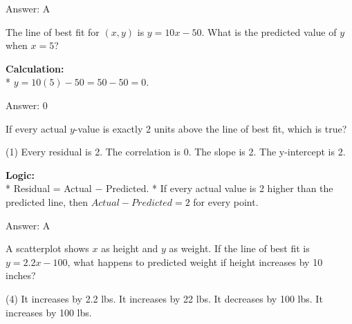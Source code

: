 \documentclass[11pt,paper=a4,answers]{exam}
\begin{document}
\begin{questions}
\begin{solution}
\vspace{30pt}

Answer: \colorbox{yellow!100}{A}
\end{solution}

\vspace{60pt}

\question
The line of best fit for $(x, y)$ is $y = 10x - 50$. What is the predicted value of $y$ when $x = 5$?

\begin{solution}
\textbf{Calculation:} \\
* $y = 10(5) - 50 = 50 - 50 = 0$.

\vspace{30pt}

Answer: \colorbox{yellow!100}{0}
\end{solution}

\vspace{60pt}

\question
If every actual $y$-value is exactly 2 units above the line of best fit, which is true?
\begin{tasks}(1)
    \task Every residual is 2.
    \task The correlation is 0.
    \task The slope is 2.
    \task The y-intercept is 2.
\end{tasks}

\begin{solution}
\textbf{Logic:} \\
* Residual = Actual $-$ Predicted.
* If every actual value is 2 higher than the predicted line, then $Actual - Predicted = 2$ for every point.

\vspace{30pt}

Answer: \colorbox{yellow!100}{A}
\end{solution}

\vspace{60pt}

\question
A scatterplot shows $x$ as height and $y$ as weight. If the line of best fit is $y = 2.2x - 100$, what happens to predicted weight if height increases by 10 inches?
\begin{tasks}(4)
    \task It increases by 2.2 lbs.
    \task It increases by 22 lbs.
    \task It decreases by 100 lbs.
    \task It increases by 100 lbs.
\end{tasks}


\end{questions}
\end{document}

